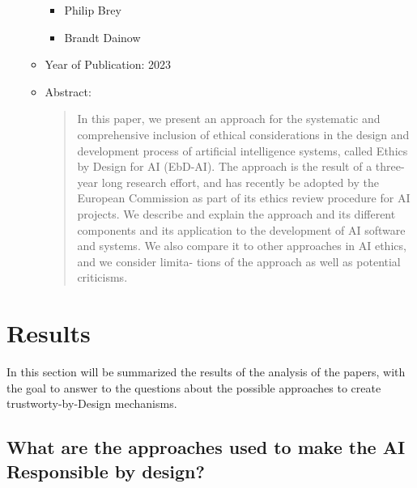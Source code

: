 \documentclass{article}
\begin{document}
\begin{itemize}
\begin{itemize}
            \begin{itemize}
        
                \item Philip Brey
        
                \item Brandt Dainow
        
            \end{itemize}
        
            \item Year of Publication: 2023
        
            \item Abstract:
        
            \begin{abstract}
        
                In this paper, we present an approach for the systematic and comprehensive inclusion of ethical considerations in the design 
                and development process of artificial intelligence systems, called Ethics by Design for AI (EbD-AI). The approach is the 
                result of a three-year long research effort, and has recently be adopted by the European Commission as part of its ethics 
                review procedure for AI projects. We describe and explain the approach and its different components and its application to 
                the development of AI software and systems. We also compare it to other approaches in AI ethics, and we consider limita-
                tions of the approach as well as potential criticisms.
        
            \end{abstract}
        
        \end{itemize}
    
    \end{itemize}
    

\newpage
\section{Results}

In this section will be summarized the results of the analysis of the papers, with the goal to answer to the questions about the possible approaches to create trustworty-by-Design mechanisms.

\subsection{What are the approaches used to make the AI Responsible by design?}
\end{document}

